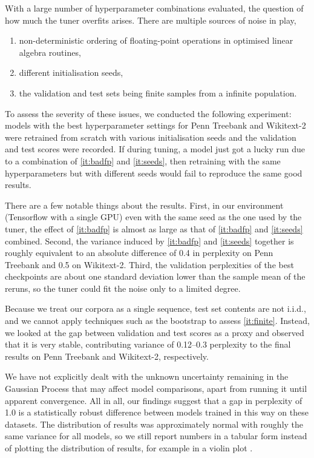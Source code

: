 \documentclass[letter]{article} \usepackage{iclr2018_conference,times}
\newcommand{\ptb}{Penn Treebank\xspace}
\newcommand{\wikitexttwo}{Wikitext-2\xspace}
\begin{document}
With a large number of hyperparameter combinations evaluated, the
question of how much the tuner overfits arises. There are multiple
sources of noise in play,
\begin{enumerate}[label=(\alph*),nolistsep]
\item \label{it:badfp}non-deterministic ordering of floating-point
  operations in optimised linear algebra routines,
\item \label{it:seeds}different initialisation seeds,
\item \label{it:finite}the validation and test sets being finite
  samples from a infinite population.
\end{enumerate}
To assess the severity of these issues, we conducted the following
experiment: models with the best hyperparameter settings for \ptb and
\wikitexttwo were retrained from scratch with various initialisation
seeds and the validation and test scores were recorded. If during
tuning, a model just got a lucky run due to a combination of
\ref{it:badfp} and \ref{it:seeds}, then retraining with the same
hyperparameters but with different seeds would fail to reproduce the
same good results.

There are a few notable things about the results. First, in our
environment (Tensorflow with a single GPU) even with the same seed as
the one used by the tuner, the effect of \ref{it:badfp} is almost as
large as that of \ref{it:badfp} and \ref{it:seeds} combined. Second,
the variance induced by \ref{it:badfp} and \ref{it:seeds} together is
roughly equivalent to an absolute difference of 0.4 in perplexity on
\ptb and 0.5 on \wikitexttwo. Third, the validation perplexities of
the best checkpoints are about one standard deviation lower than the
sample mean of the reruns, so the tuner could fit the noise only to a
limited degree.

Because we treat our corpora as a single sequence, test set contents
are not i.i.d., and we cannot apply techniques such as the bootstrap
to assess \ref{it:finite}. Instead, we looked at the gap between
validation and test scores as a proxy and observed that it is very
stable, contributing variance of 0.12--0.3 perplexity to the final
results on \ptb and \wikitexttwo, respectively.

We have not explicitly dealt with the unknown uncertainty remaining in
the Gaussian Process that may affect model comparisons, apart from
running it until apparent convergence. All in all, our findings
suggest that a gap in perplexity of 1.0 is a statistically robust
difference between models trained in this way on these datasets. The
distribution of results was approximately normal with roughly the same
variance for all models, so we still report numbers in a tabular form
instead of plotting the distribution of results, for example in a
violin plot \citep{hintze1998violin}.
\end{document}
